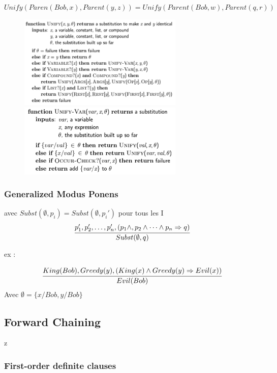 \documentclass[12pt]{article}
\begin{document}
			$Unify(Paren(Bob,x), Parent(y,z)) = Unify(Parent(Bob,w), Parent(q,r))$
		
			\begin{figure}[htp]	
				\centering
				\includegraphics[width=0.7\textwidth]{img/Unification.png}
				\includegraphics[width=0.7\textwidth]{img/Unification1.png}
			\end{figure}
			
		\subsubsection{Generalized Modus Ponens}
			avec $Subst(\emptyset, p_i) = Subst(\emptyset,p_i')$ pour tous les I
			\begin{equation}
				\cfrac{p_1', p_2',\dots,p_n',(p_1 \land,p_2 \land \dots \land p_n \Rightarrow q)}{Subst(\emptyset, q)}
			\end{equation}
			
			ex :
			
			\begin{equation}
			\cfrac{King(Bob), Greedy(y), (King(x) \land Greedy(y) \Rightarrow Evil(x))}{Evil(Bob)}
			\end{equation}
			Avec $\emptyset = \{x/Bob, y/Bob\}$	
			
	\subsection{Forward Chaining}z
		\subsubsection{First-order definite clauses}
\end{document}

